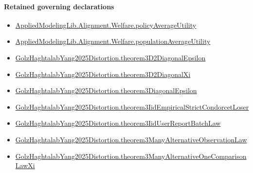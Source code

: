 \documentclass[10pt]{article}
\begin{document}
\paragraph{Retained governing declarations}
\begin{itemize}\raggedright
\item \hyperlink{library-prerequisite-184c74a4db4311c2}{Applied\allowbreak{}Modeling\allowbreak{}Lib.\allowbreak{}Alignment.\allowbreak{}Welfare.\allowbreak{}policy\allowbreak{}Average\allowbreak{}Utility}
\item \hyperlink{library-prerequisite-15f4b442749deab2}{Applied\allowbreak{}Modeling\allowbreak{}Lib.\allowbreak{}Alignment.\allowbreak{}Welfare.\allowbreak{}population\allowbreak{}Average\allowbreak{}Utility}
\item \hyperlink{governing-declaration-0f03655f38b9e33e}{Golz\allowbreak{}Haghtalab\allowbreak{}Yang2025\allowbreak{}Distortion.\allowbreak{}theorem3\allowbreak{}D2\allowbreak{}Diagonal\allowbreak{}Epsilon}
\item \hyperlink{governing-declaration-783b316e1c8a0ee2}{Golz\allowbreak{}Haghtalab\allowbreak{}Yang2025\allowbreak{}Distortion.\allowbreak{}theorem3\allowbreak{}D2\allowbreak{}Diagonal\allowbreak{}Xi}
\item \hyperlink{governing-declaration-a7437eb8cad7f1a3}{Golz\allowbreak{}Haghtalab\allowbreak{}Yang2025\allowbreak{}Distortion.\allowbreak{}theorem3\allowbreak{}Diagonal\allowbreak{}Epsilon}
\item \hyperlink{governing-declaration-8d2e05cae4023172}{Golz\allowbreak{}Haghtalab\allowbreak{}Yang2025\allowbreak{}Distortion.\allowbreak{}theorem3\allowbreak{}Iid\allowbreak{}Empirical\allowbreak{}Strict\allowbreak{}Condorcet\allowbreak{}Loser}
\item \hyperlink{governing-declaration-7fc5db381e1a8f71}{Golz\allowbreak{}Haghtalab\allowbreak{}Yang2025\allowbreak{}Distortion.\allowbreak{}theorem3\allowbreak{}Iid\allowbreak{}User\allowbreak{}Report\allowbreak{}Batch\allowbreak{}Law}
\item \hyperlink{governing-declaration-8cd7a7c5a45b332d}{Golz\allowbreak{}Haghtalab\allowbreak{}Yang2025\allowbreak{}Distortion.\allowbreak{}theorem3\allowbreak{}Many\allowbreak{}Alternative\allowbreak{}Observation\allowbreak{}Law}
\item \hyperlink{governing-declaration-94724c60280865f4}{Golz\allowbreak{}Haghtalab\allowbreak{}Yang2025\allowbreak{}Distortion.\allowbreak{}theorem3\allowbreak{}Many\allowbreak{}Alternative\allowbreak{}One\allowbreak{}Comparison\allowbreak{}Law\allowbreak{}Xi}

\end{itemize}
\end{document}
